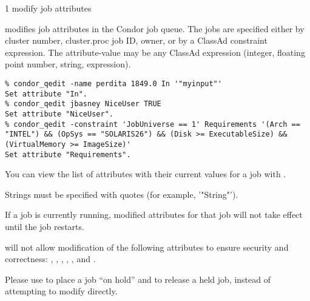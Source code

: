\begin{ManPage}{\label{man-condor-qedit}}{1}
{modify job attributes}
\Synopsis {}
\Arg{\Dots}


\Description

 modifies job attributes in the Condor job queue.  The
jobs are specified either by cluster number, cluster.proc job ID,
owner, or by a ClassAd constraint expression.  The attribute-value may
be any ClassAd expression (integer, floating point number, string,
expression).

\begin{Options}
\end{Options}

\begin{Examples}
\begin{verbatim}
% condor_qedit -name perdita 1849.0 In '"myinput"'
Set attribute "In".
% condor_qedit jbasney NiceUser TRUE
Set attribute "NiceUser".
% condor_qedit -constraint 'JobUniverse == 1' Requirements '(Arch == "INTEL") && (OpSys == "SOLARIS26") && (Disk >= ExecutableSize) && (VirtualMemory >= ImageSize)'
Set attribute "Requirements".
\end{verbatim}
\end{Examples}

\begin{GenRem}
You can view the list of attributes with their current values for a
job with  .

Strings must be specified with quotes (for example, '"String"').

If a job is currently running, modified attributes for that job will
not take effect until the job restarts.

 will not allow modification of the following
attributes to ensure security and correctness: ,
, , , , and
.

Please use  to place a job ``on hold'' and
 to release a held job, instead of attempting to
modify  directly.
\end{GenRem}

\end{ManPage}
